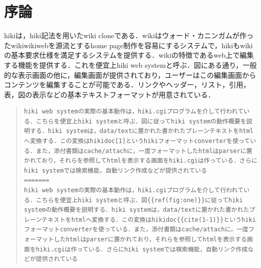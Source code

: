 \section{序論}
hikiは，hiki記法を用いたwiki cloneである．wikiはウォード・カニンガムが作ったwikiwikiwebを源流とするhome page制作を容易にするシステムで，hikiもwikiの基本要求仕様を満足するシステムを提供する．wikiの特徴であるweb上で編集する機能を提供する．これを便宜上hiki web systemと呼ぶ．図にある通り，一般的な表示画面の他に，編集画面が提供されており，ユーザーはこの編集画面からコンテンツを編集することが可能である．リンクやヘッダー，リスト，引用，表，図の表示などの基本テキストフォーマットが用意されている．
\begin{quote}\begin{verbatim}
hiki web systemの実際の基本動作は，hiki.cgiプログラムを介して行われている．こちらを便宜上hiki systemと呼ぶ．図に従ってhiki systemの動作概要を説明する．hiki systemは，data/textに置かれた書かれたプレーンテキストをhtmlへ変換する．この変換はhikidoc[1]というhikiフォーマットconverterを使っている．また，添付書類はcache/attachに，一度フォーマットしたhtmlはparserに置かれており，それらを参照してhtmlを表示する画面をhiki.cgiは作っている．さらにhiki systemでは検索機能，自動リンク作成などが提供されている
=======
hiki web systemの実際の基本動作は，hiki.cgiプログラムを介して行われている．こちらを便宜上hiki systemと呼ぶ．図{{ref(fig:one)}}に従ってhiki systemの動作概要を説明する．hiki systemは，data/textに置かれた書かれたプレーンテキストをhtmlへ変換する．この変換はhikidoc{{cite(1-1)}}というhikiフォーマットconverterを使っている．また，添付書類はcache/attachに，一度フォーマットしたhtmlはparserに置かれており，それらを参照してhtmlを表示する画面をhiki.cgiは作っている．さらにhiki systemでは検索機能，自動リンク作成などが提供されている
\end{verbatim}\end{quote}
